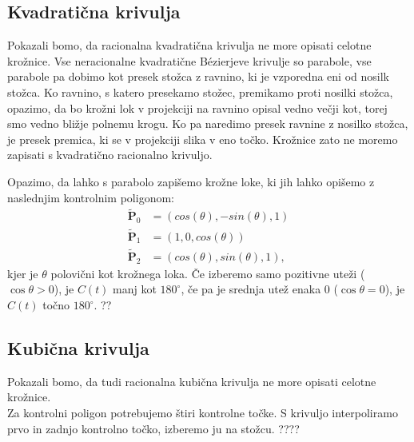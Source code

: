 \documentclass[a4paper,11pt]{article}
\theoremstyle{definition}
\theoremstyle{plain}
\begin{document}

\subsection{ Kvadratična krivulja}
Pokazali bomo, da racionalna kvadratična krivulja ne more opisati celotne krožnice. Vse neracionalne kvadratične B\'ezierjeve krivulje so parabole, vse parabole pa dobimo kot presek stožca z ravnino, ki je vzporedna eni od nosilk stožca. Ko ravnino, s katero presekamo stožec, premikamo proti nosilki stožca, opazimo, da bo krožni lok v projekciji  na ravnino opisal vedno večji kot, torej smo vedno bližje polnemu krogu. Ko pa naredimo presek ravnine z nosilko stožca, je presek premica, ki se v projekciji slika v eno točko. Krožnice zato ne moremo zapisati s kvadratično racionalno krivuljo. 

Opazimo, da lahko s parabolo zapišemo krožne loke, ki jih lahko opišemo z naslednjim kontrolnim poligonom:
\begin{align*}
\boldsymbol{\tilde{P}}_0 &= (cos(\theta), -sin(\theta), 1)\\
\boldsymbol{\tilde{P}}_1 &= (1, 0, cos(\theta))\\
\boldsymbol{\tilde{P}}_2 &= (cos(\theta), sin(\theta), 1),
\end{align*}
kjer je $\theta$ polovični kot krožnega loka. Če izberemo samo pozitivne uteži ($\cos{\theta}>0$), je $C(t)$ manj kot $180^{\circ}$, če pa je srednja utež enaka $0$ ($\cos{\theta}=0$), je $C(t)$ točno $180^{\circ}$. ??


\subsection{Kubična krivulja}
Pokazali bomo, da tudi racionalna kubična krivulja ne more opisati celotne krožnice. \\
Za kontrolni poligon potrebujemo štiri kontrolne točke. S krivuljo interpoliramo prvo in zadnjo kontrolno točko, izberemo ju na stožcu.
????

\end{document}

